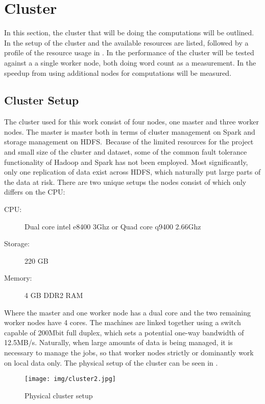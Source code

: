 \section{Cluster}\label{sec:cluster}
In this section, the cluster that will be doing the computations will be outlined. In  the setup of the cluster and the available resources are listed, followed by a profile of the resource usage in . In  the performance of the cluster will be tested against a a single worker node, both doing word count as a measurement. In  the speedup from using additional nodes for computations will be measured.

\subsection{Cluster Setup}\label{sec:clustersetup}

The cluster used for this work consist of four nodes, one master and three worker nodes. The master is master both in terms of cluster management on Spark and storage management on HDFS.\ Because of the limited resources for the project and small size of the cluster and dataset, some of the common fault tolerance functionality of Hadoop and Spark has not been employed. Most significantly, only one replication of data exist across HDFS, which naturally put large parts of the data at risk. There are two unique setups the nodes consist of which only differs on the CPU:\@
\begin{description}
\item[CPU:] Dual core intel e8400 3Ghz or Quad core q9400 2.66Ghz
\item[Storage:] 220 GB
\item[Memory:] 4 GB DDR2 RAM
\end{description}

Where the master and one worker node has a dual core and the two remaining worker nodes have 4 cores. The machines are linked together using a switch capable of 200Mbit full duplex, which sets a potential one-way bandwidth of 12.5MB/s. Naturally, when large amounts of data is being managed, it is necessary to manage the jobs, so that worker nodes strictly or dominantly work on local data only. The physical setup of the cluster can be seen in .

\begin{figure}[!htb]
  \centering
    \texttt{[image: img/cluster2.jpg]}
  \caption{Physical cluster setup}\label{fig:clustersetup}
\end{figure}

